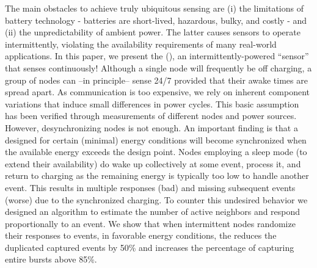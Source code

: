 The main obstacles to achieve truly ubiquitous sensing are (i) the limitations of battery technology - batteries are short-lived, hazardous, bulky, and costly - and (ii) the unpredictability of ambient power. The latter causes sensors to operate intermittently, violating the availability requirements of many real-world applications. 
%
In this paper, we present the \textit{\fullcis} (\cis), an
intermittently-powered ``sensor'' that senses continuously! Although
a single node will frequently be off charging, a group of nodes can
--in principle-- sense 24/7 provided that their awake times are spread
apart. As communication is too expensive, we rely on inherent component
variations that induce small differences in power cycles. This basic
assumption has been verified through measurements of different nodes
and power sources. However, desynchronizing nodes is not enough.
%
An important finding is that a \cis designed for certain (minimal)
energy conditions will become synchronized when the available energy
exceeds the design point. Nodes employing a sleep mode (to extend
their availability) do wake up collectively at some event, process it,
and return to charging as the remaining energy is typically too low to
handle another event. This results in multiple responses (bad)
and missing subsequent events (worse) due to the synchronized charging.
To counter this undesired behavior we designed an algorithm to estimate the number of active neighbors and respond proportionally to an event. 
We show that when intermittent nodes randomize their responses to events, in favorable energy conditions, the \cis reduces the duplicated captured events by 50\% and increases the percentage of capturing entire bursts above 85\%. 


